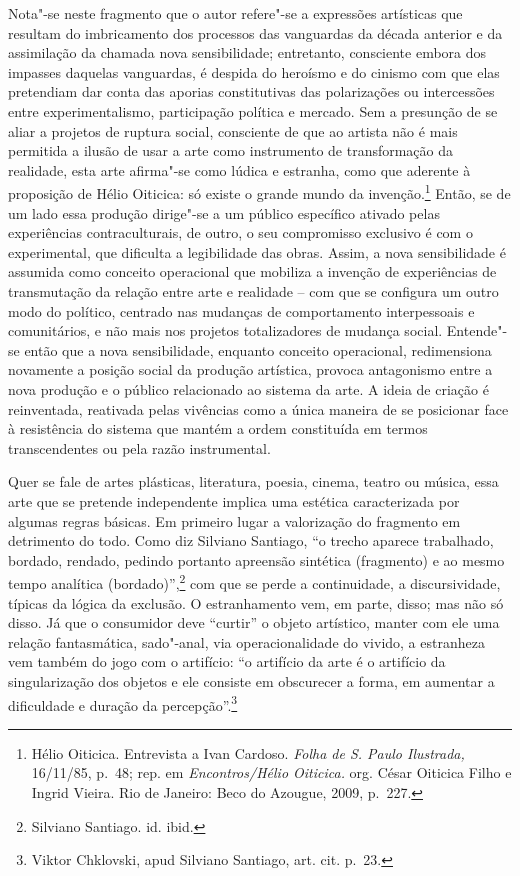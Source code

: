 Nota"-se neste fragmento que o autor refere"-se a expressões artísticas
que resultam do imbricamento dos processos das vanguardas da década
anterior e da assimilação da chamada nova sensibilidade; entretanto,
consciente embora dos impasses daquelas vanguardas, é despida do
heroísmo e do cinismo com que elas pretendiam dar conta das aporias
constitutivas das polarizações ou intercessões entre experimentalismo,
participação política e mercado. Sem a presunção de se aliar a projetos
de ruptura social, consciente de que ao artista não é mais permitida a
ilusão de usar a arte como instrumento de transformação da realidade,
esta arte afirma"-se como lúdica e estranha, como que aderente à
proposição de Hélio Oiticica: só existe o grande mundo da
invenção.\footnote{Hélio Oiticica. Entrevista a Ivan Cardoso.
  \emph{Folha de S. Paulo Ilustrada,} 16/11/85, p.~48; rep. em
  \emph{Encontros/Hélio Oiticica.} org. César Oiticica Filho e Ingrid
  Vieira. Rio de Janeiro: Beco do Azougue, 2009, p.~227.} Então, se de
um lado essa produção dirige"-se a um público específico ativado pelas
experiências contraculturais, de outro, o seu compromisso exclusivo é
com o experimental, que dificulta a legibilidade das obras. Assim, a
nova sensibilidade é assumida como conceito operacional que mobiliza a
invenção de experiências de transmutação da relação entre arte e
realidade -- com que se configura um outro modo do político, centrado
nas mudanças de comportamento interpessoais e comunitários, e não mais
nos projetos totalizadores de mudança social. Entende"-se então que a
nova sensibilidade, enquanto conceito operacional, redimensiona
novamente a posição social da produção artística, provoca antagonismo
entre a nova produção e o público relacionado ao sistema da arte. A
ideia de criação é reinventada, reativada pelas vivências como a única
maneira de se posicionar face à resistência do sistema que mantém a
ordem constituída em termos transcendentes ou pela razão instrumental.

Quer se fale de artes plásticas, literatura, poesia, cinema, teatro ou
música, essa arte que se pretende independente implica uma estética
caracterizada por algumas regras básicas. Em primeiro lugar a
valorização do fragmento em detrimento do todo. Como diz Silviano
Santiago, ``o trecho aparece trabalhado, bordado, rendado, pedindo
portanto apreensão sintética (fragmento) e ao mesmo tempo analítica
(bordado)'',\footnote{Silviano Santiago. id. ibid.} com que se perde a
continuidade, a discursividade, típicas da lógica da exclusão. O
estranhamento vem, em parte, disso; mas não só disso. Já que o
consumidor deve ``curtir'' o objeto artístico, manter com ele uma
relação fantasmática, sado"-anal, via operacionalidade do vivido, a
estranheza vem também do jogo com o artifício: ``o artifício da arte é
o artifício da singularização dos objetos e ele consiste em obscurecer a
forma, em aumentar a dificuldade e duração da percepção''.\footnote{Viktor
  Chklovski, apud Silviano Santiago, art. cit. p.~23.}

